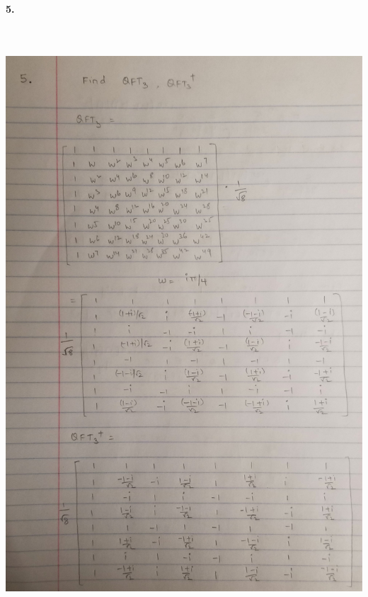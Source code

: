 \documentclass [12pt]{article}
\theoremstyle{definition}
\begin{document}
{\bf 5.} \\
\includegraphics[width=18cm, height=23cm]{I3}
\end{document}
